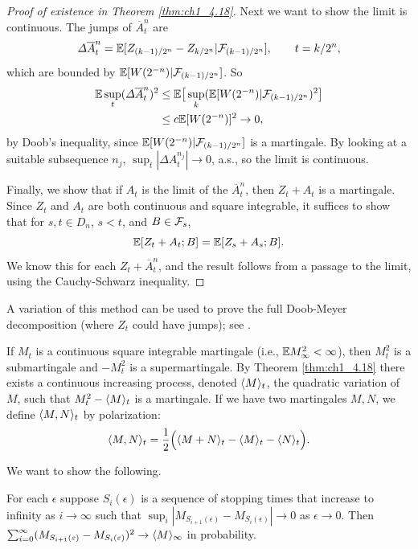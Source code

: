 \begin{proof}[Proof of existence in Theorem \ref{thm:ch1_4.18}]
Next we want to show the limit is continuous. The jumps of $\overline{A}_t^n$ are
\[
    \varDelta\overline{A}_t^n = \mathbb{E}[Z_{(k-1)/2^n} - Z_{k/2^n}| \mathcal{F}_{(k-1)/2^n}], \qquad t = k/2^n,
\]
which are bounded by $\mathbb{E}[W(2^{-n})| \mathcal{F}_{(k-1)/2^n}]$. So
\begin{align*}
    \mathbb{E} \sup_t(\varDelta\overline{A}_t^n)^2 &\leq \mathbb{E}\big[\sup_k(\mathbb{E}[W(2^{-n})|\mathcal{F}_{(k-1)/2^n})^2\big] \\
    &\leq c\mathbb{E}[W(2^{-n})]^2 \to 0,
\end{align*}
by Doob's inequality, since $\mathbb{E}[W(2^{-n})| \mathcal{F}_{(k-1)/2^n}]$ is a martingale. By looking at a suitable subsequence $n_j$, $\sup_t |\Delta A_t^{n_j}| \to 0$, a.s., so the limit is continuous.

Finally, we show that if $A_t$ is the limit of the $\overline{A}_t^n$, then $Z_t + A_t$ is a martingale. Since $Z_t$ and $A_t$ are both continuous and square integrable, it suffices to show that for $s,t \in D_n$, $s < t$, and $B \in \mathcal{F}_s$,
\[
    \mathbb{E}[Z_t + A_t; B] = \mathbb{E}[Z_s + A_s; B].
\]
We know this for each $Z_t + \overline{A}_t^n$, and the result follows from a passage to the limit, using the Cauchy-Schwarz inequality.
\end{proof}

A variation of this method can be used to prove the full Doob-Meyer decomposition (where $Z_t$ could have jumps); see \cite{Bass1994}.



If $M_t$ is a continuous square integrable martingale (i.e., $\mathbb{E} M_\infty^2 < \infty$), then $M_t^2$ is a submartingale and $-M_t^2$ is a supermartingale. By Theorem \ref{thm:ch1_4.18} there exists a continuous increasing process, denoted $\langle M \rangle_t$, the quadratic variation of $M$, such that $M_t^2 - \langle M \rangle_t$ is a martingale. If we have two martingales $M,N$, we define $\langle M,N \rangle_t$ by polarization:
\begin{equation}\label{eq:ch1_4.14}
    \langle M,N \rangle_t = \frac{1}{2}\Big(\langle M + N \rangle_t - \langle M \rangle_t - \langle N \rangle_t\Big).
\end{equation}

We want to show the following.

\begin{theorem}\label{thm:ch1_4.23}
For each $\epsilon$ suppose $S_i(\epsilon)$ is a sequence of stopping times that increase to infinity as $i \to \infty$ such that $\sup_i |M_{S_{i+1}(\epsilon)} - M_{S_i(\epsilon)}| \to 0$ as $\epsilon \to 0$. Then $\sum_{i=0}^{\infty}(M_{S_{i+1}(\varepsilon)} - M_{S_i(\varepsilon)})^2 \to \langle M \rangle_\infty$ in probability.
\end{theorem}

